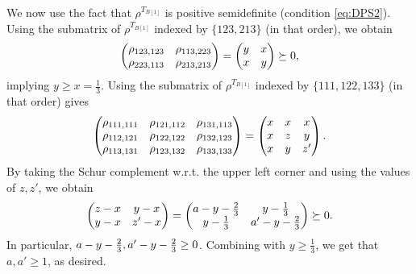 \documentclass[11pt]{article}
\makeatletter
\theoremstyle{plain}
\renewenvironment{proof}[1][\proofname]{%
  \par
  \pushQED{}%
  \normalfont
  \topsep6\p@\@plus6\p@
  \trivlist
  \item[\hskip\labelsep\itshape #1\@addpunct{.}]%
}{%
  \popQED
  \endtrivlist
}
\makeatother
\begin{document}
\begin{proof}
    We now use the fact that $\rho^{T_{B[1]}}$ is positive semidefinite (condition \eqref{eq:DPS2}). 
    Using the submatrix of $\rho^{T_{B[1]}}$ indexed by $\{123, 213\}$ (in that order), we obtain
    $$
  \begin{pmatrix}
  \rho_{123,123} & \rho_{113,223}\cr \rho_{223,113}& \rho_{213,213}
  \end{pmatrix}  
  =
    \begin{pmatrix}
        y&x\\
        x&y
    \end{pmatrix}\succeq 0,$$
 implying      $y\geq x=\frac{1}{3}$. Using the submatrix of $\rho^{T_{B[1]}}$  indexed by $\{111,122, 133\}$ (in that order) gives
     $$
    \begin{pmatrix}
    \rho_{111,111} & \rho_{121,112} & \rho_{131,113}\cr
    \rho_{112,121} & \rho_{122,122} & \rho_{132,123}\cr
    \rho_{113,131} & \rho_{123,132} & \rho_{133,133}
    \end{pmatrix}    
    =
    \begin{pmatrix}
        x&x&x\\
        x&z&y\\
        x&y&z'
    \end{pmatrix}. $$ %
    By taking the Schur complement w.r.t. the upper left corner and using the values of $z,z'$, we obtain
    $$\begin{pmatrix}
    z-x&y-x\cr y-x&z'-x\end{pmatrix}= 
    \begin{pmatrix}
        a-y-\frac{2}{3}&y-\frac{1}{3}\\
        y-\frac{1}{3}&a'-y-\frac{2}{3}
    \end{pmatrix}\succeq 0.$$
  In particular, $a-y-{2\over 3}, a'-y-{2\over 3}\ge 0$.   Combining with  $y\geq\frac{1}{3}$, we get that $a,a'\geq1$, as desired.
    

\end{proof}
\end{document}
